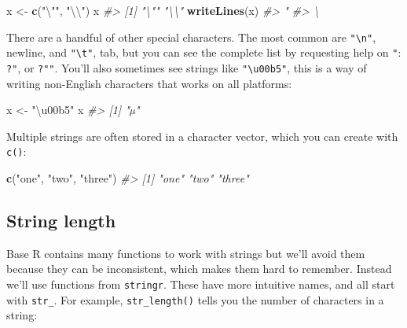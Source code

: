 \documentclass[]{book}
\newenvironment{Shaded}{\begin{snugshade}}{\end{snugshade}}
\newcommand{\CharTok}[1]{\textcolor[rgb]{0.31,0.60,0.02}{#1}}
\newcommand{\CommentTok}[1]{\textcolor[rgb]{0.56,0.35,0.01}{\textit{#1}}}
\newcommand{\KeywordTok}[1]{\textcolor[rgb]{0.13,0.29,0.53}{\textbf{#1}}}
\newcommand{\NormalTok}[1]{#1}
\newcommand{\StringTok}[1]{\textcolor[rgb]{0.31,0.60,0.02}{#1}}
\begin{document}
\begin{Shaded}
\begin{Highlighting}[]
\NormalTok{x <-}\StringTok{ }\KeywordTok{c}\NormalTok{(}\StringTok{"}\CharTok{\textbackslash{}"}\StringTok{"}\NormalTok{, }\StringTok{"}\CharTok{\textbackslash{}\textbackslash{}}\StringTok{"}\NormalTok{)}
\NormalTok{x}
\CommentTok{#> [1] "\textbackslash{}"" "\textbackslash{}\textbackslash{}"}
\KeywordTok{writeLines}\NormalTok{(x)}
\CommentTok{#> "}
\CommentTok{#> \textbackslash{}}
\end{Highlighting}
\end{Shaded}

There are a handful of other special characters. The most common are \texttt{"\textbackslash{}n"}, newline, and \texttt{"\textbackslash{}t"}, tab, but you can see the complete list by requesting help on \texttt{"}: \texttt{?\textquotesingle{}"\textquotesingle{}}, or \texttt{?"\textquotesingle{}"}. You'll also sometimes see strings like \texttt{"\textbackslash{}u00b5"}, this is a way of writing non-English characters that works on all platforms:

\begin{Shaded}
\begin{Highlighting}[]
\NormalTok{x <-}\StringTok{ "\textbackslash{}u00b5"}
\NormalTok{x}
\CommentTok{#> [1] "µ"}
\end{Highlighting}
\end{Shaded}

Multiple strings are often stored in a character vector, which you can create with \texttt{c()}:

\begin{Shaded}
\begin{Highlighting}[]
\KeywordTok{c}\NormalTok{(}\StringTok{"one"}\NormalTok{, }\StringTok{"two"}\NormalTok{, }\StringTok{"three"}\NormalTok{)}
\CommentTok{#> [1] "one"   "two"   "three"}
\end{Highlighting}
\end{Shaded}

\hypertarget{string-length}{%
\subsection{String length}\label{string-length}}

Base R contains many functions to work with strings but we'll avoid them because they can be inconsistent, which makes them hard to remember. Instead we'll use functions from \texttt{stringr}. These have more intuitive names, and all start with \texttt{str\_}. For example, \texttt{str\_length()} tells you the number of characters in a string:
\end{document}
